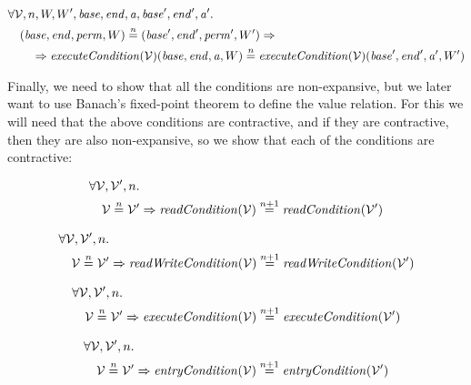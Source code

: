 \documentclass{article}
\newcommand{\nequal}[1][n]{\stackrel{\tiny{#1}}{=}}
\newcommand{\var}[1]{\mathit{#1}}
\newcommand{\addr}{\var{a}}
\newcommand{\start}{\var{base}}
\newcommand{\addrend}{\var{end}}
\newcommand{\perm}{\var{perm}}
\newcommand{\plainfun}[2]{
  \ifthenelse{\equal{#2}{}}
             {\mathit{#1}}
             {\mathit{#1}(#2)}
}
\newcommand{\readCond}[1]{\plainfun{readCondition}{#1}}
\newcommand{\writeCond}[1]{\plainfun{readWriteCondition}{#1}}
\newcommand{\execCond}[1]{\plainfun{executeCondition}{#1}}
\newcommand{\entryCond}[1]{\plainfun{entryCondition}{#1}}
\newcommand{\asmType}{\plaindom{AsmType}}
\newcommand{\plaindom}[1]{\mathrm{#1}}
\newcommand{\intr}[2]{\mathcal{#1}}
\newcommand{\valueintr}[1]{\intr{V}{#1}}
\newcommand{\stdvr}{\valueintr{\asmType}}
\begin{document}
\begin{lemma}
\label{lem:en-ne-world}
  \begin{align*}
    &\forall \stdvr,n, W, W',\start,\addrend,\addr, \start', \addrend', \addr' \ldotp \\
    &\quad (\start,\addrend,\perm,W) \nequal (\start',\addrend',\perm',W') \Rightarrow \\
    &\qquad \Rightarrow \execCond{}(\stdvr)(\start,\addrend,\addr,W) \nequal \execCond{}(\stdvr)(\start',\addrend',\addr',W')
  \end{align*}
\end{lemma}
Finally, we need to show that all the conditions are non-expansive, but we later want to use Banach's fixed-point theorem to define the value relation. For this we will need that the above conditions are contractive, and if they are contractive, then they are also non-expansive, so we show that each of the conditions are contractive:
\begin{lemma}
  \label{lem:rc-con}
  \begin{align*}
    &\forall \stdvr, \stdvr', n \ldotp \\
    &\quad \stdvr \nequal \stdvr' \Rightarrow \readCond{}(\stdvr) \nequal[n+1] \readCond{}(\stdvr')
  \end{align*}
\end{lemma}

\begin{lemma}
  \label{lem:wc-con}
  \begin{align*}
    &\forall \stdvr, \stdvr', n \ldotp \\
    &\quad \stdvr \nequal \stdvr' \Rightarrow \writeCond{}(\stdvr) \nequal[n+1] \writeCond{}(\stdvr')
  \end{align*}
\end{lemma}

\begin{lemma}
  \label{lem:ec-con}
  \begin{align*}
    &\forall \stdvr, \stdvr', n \ldotp \\
    &\quad \stdvr \nequal \stdvr' \Rightarrow \execCond{}(\stdvr) \nequal[n+1] \execCond{}(\stdvr')
  \end{align*}
\end{lemma}

\begin{lemma}
  \label{lem:en-con}
  \begin{align*}
    &\forall \stdvr, \stdvr', n \ldotp \\
    &\quad \stdvr \nequal \stdvr' \Rightarrow \entryCond{}(\stdvr) \nequal[n+1] \entryCond{}(\stdvr')
  \end{align*}
\end{lemma}
\end{document}
